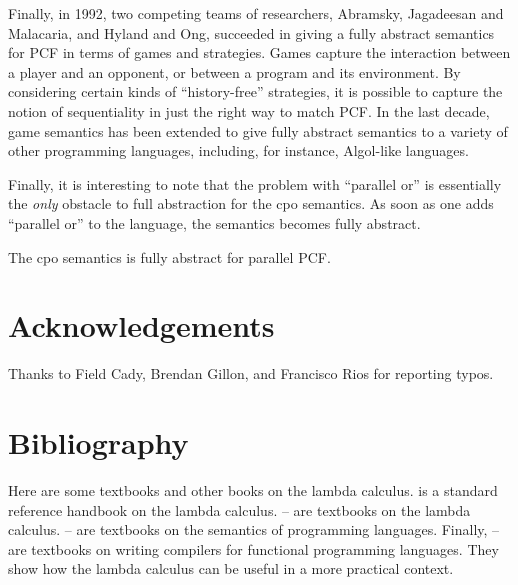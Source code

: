\documentclass{article}
\begin{document}
Finally, in 1992, two competing teams of researchers, Abramsky,
Jagadeesan and Malacaria, and Hyland and Ong, succeeded in giving a
fully abstract semantics for PCF in terms of games and strategies.
Games capture the interaction between a player and an opponent, or
between a program and its environment. By considering certain kinds of
``history-free'' strategies, it is possible to capture the notion of
sequentiality in just the right way to match PCF. In the last decade,
game semantics has been extended to give fully abstract semantics to a
variety of other programming languages, including, for instance,
Algol-like languages.

Finally, it is interesting to note that the problem with ``parallel or''
is essentially the {\em only} obstacle to full abstraction for the cpo
semantics. As soon as one adds ``parallel or'' to the language, the
semantics becomes fully abstract.

\begin{theorem}
  The cpo semantics is fully abstract for parallel PCF.
\end{theorem}

\section{Acknowledgements}

Thanks to Field Cady, Brendan Gillon, and Francisco Rios for reporting
typos.

\section{Bibliography}\label{ssec-bibliography}

Here are some textbooks and other books on the lambda calculus.
{\cite{Bar84}} is a standard reference handbook on the lambda
calculus.  {\cite{GLT89}}--{\cite{Rev88}} are textbooks on the lambda
calculus. {\cite{Win93}}--{\cite{Hen90}} are textbooks on the
semantics of programming languages. Finally,
{\cite{Pey87}--\cite{App92}} are textbooks on writing compilers for
functional programming languages. They show how the lambda calculus
can be useful in a more practical context.
\end{document}
